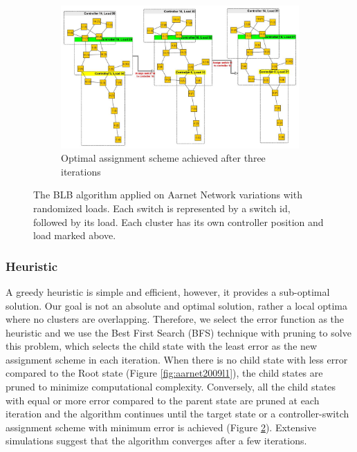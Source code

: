\documentclass[preprint,12pt]{elsarticle}
\begin{document}
\begin{figure}
\begin{subfigure}{0.3\textwidth}
		\end{subfigure}
		~
		\begin{subfigure}{\textwidth}
			\includegraphics[width=\linewidth]{Images/Aarnet_Load_2.jpg}
			\caption{Optimal assignment scheme achieved after three iterations}
			\label{fig:aarnet2009l2}
		\end{subfigure}
		\caption{The BLB algorithm applied on Aarnet Network variations with randomized loads. Each switch is represented by a switch id, followed by its load. Each cluster has its own controller position and load marked above.}
	\end{figure}

	\subsubsection{Heuristic}
	A greedy heuristic is simple and efficient, however, it provides a sub-optimal solution. Our goal is not an absolute and optimal solution, rather a local optima where no clusters are overlapping. Therefore, we select the error function as the heuristic and we use the Best First Search (BFS) technique with pruning to solve this problem, which selects the child state with the least error as the new assignment scheme in each iteration. When there is no child state with less error compared to the Root state (Figure \ref{fig:aarnet2009l1}), the child states are pruned to minimize computational complexity. Conversely, all the child states with equal or more error compared to the parent state are pruned at each iteration and the algorithm continues until the target state or a controller-switch assignment scheme with minimum error is achieved  (Figure \ref{fig:aarnet2009l2}). Extensive simulations suggest that the algorithm converges after a few iterations.
	
\end{document}

